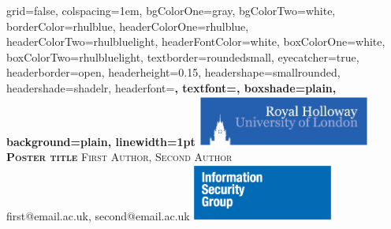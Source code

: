 \documentclass[landscape,final,a0paper,fontscale=0.275]{baposter}
\begin{document}
\begin{poster}%
  {
  grid=false,
  colspacing=1em,
  bgColorOne=gray,
  bgColorTwo=white,
  borderColor=rhulblue,
  headerColorOne=rhulblue,
  headerColorTwo=rhulbluelight,
  headerFontColor=white,
  boxColorOne=white,
  boxColorTwo=rhulbluelight,
  textborder=roundedsmall,
  eyecatcher=true,
  headerborder=open,
  headerheight=0.15\textheight,
  headershape=smallrounded,
  headershade=shadelr,
  headerfont=\Large\bf\textsc, %
  textfont={\setlength{\parindent}{1.5em}},
  boxshade=plain,
  background=plain,
  linewidth=1pt
  }
  {\includegraphics[height=4.5em]{images/rhul-logo}} 
  {\bf\textsc{Poster title}\vspace{0.16em}}
  {\textsc{First Author, Second Author}\vspace{0.12em}\\
  {\smaller first@email.ac.uk, second@email.ac.uk}}
  {%
    \includegraphics[height=5em]{images/isg-logo}
  }




\end{poster}
\end{document}
